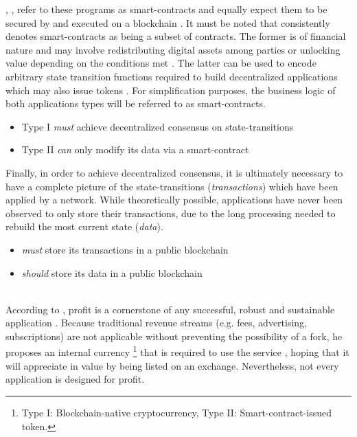 \begin{description}[format={\storedescriptionlabel}]
	\citeauthor{Raval.2016}, \citeauthor{Antonopoulos.2018}, refer to these programs as smart-contracts and equally expect them to be secured by and executed on a blockchain \cite[p.~13]{Raval.2016} \cite[pp.~23,~34]{Antonopoulos.2018}. It must be noted that \citeauthor{Buterin2014} consistently denotes smart-contracts as being a subset of contracts. The former is of financial nature and may involve redistributing digital assets among parties or unlocking value depending on the conditions met \cite[pp.~1,~13]{EthereumWhitepaper}. The latter can be used to encode arbitrary state transition functions required to build decentralized applications which may also issue tokens \cite[pp.~1,~19]{EthereumWhitepaper}. For simplification purposes, the business logic of both applications types will be referred to as smart-contracts. 	

	\begin{itemize}
  		\item Type I \textit{must} achieve decentralized consensus on state-transitions
  		\item Type II \textit{can} only modify its data via a smart-contract
	\end{itemize}

	Finally, in order to achieve decentralized consensus, it is ultimately necessary to have a complete picture of the state-transitions (\textit{transactions}) which have been applied by a network. While theoretically possible, applications have never been observed to only store their transactions, due to the long processing needed to rebuild the most current state (\textit{data}). 
	
	\begin{itemize}
  		\item \textit{must} store its transactions in a public blockchain
  		\item \textit{should} store its data in a public blockchain
	\end{itemize}

	\item[Internal currency]
	\hfill \\
	According to \citeauthor{Raval.2016}, profit is a cornerstone of any successful, robust and sustainable application \cite[p.~9]{Raval.2016}. Because traditional revenue streams (e.g. fees, advertising, subscriptions) are not applicable without preventing the possibility of a fork, he proposes an internal currency \footnote{Type I: Blockchain-native cryptocurrency, Type II: Smart-contract-issued token.} that is required to use the service \cite[p.~11]{Raval.2016}, hoping that it will appreciate in value by being listed on an exchange. Nevertheless, not every application is designed for profit.
	

\end{description}

